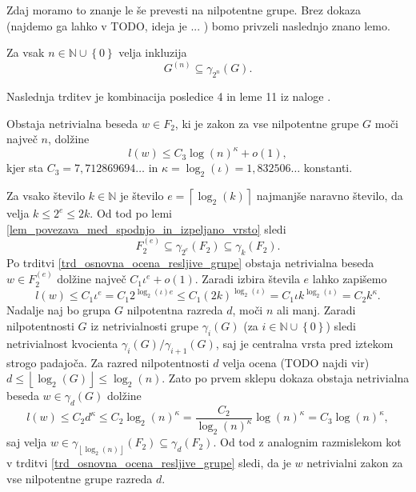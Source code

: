\documentclass[mat1, tisk]{fmfdelo}
\numberwithin{equation}{section}  %
\begin{document}
Zdaj moramo to znanje le še prevesti na nilpotentne grupe. Brez dokaza (najdemo ga lahko v TODO, ideja je ... ) bomo privzeli naslednjo znano lemo. 

\begin{lema}
\label{lem_povezava_med_spodnjo_in_izpeljano_vrsto}
Za vsak $n \in \mathbb{N} \cup \left\{ 0\right\} $ velja inkluzija
\begin{equation*}
G^{(n)} \subseteq \gamma_{2^{n}}(G).
\end{equation*}    
\end{lema}

Naslednja trditev je kombinacija posledice 4 in leme 11 iz naloge \cite{Schneider_2016}.

\begin{trditev}
\label{trd_koncna_ugotovitev_nilpotentne_v_nalogi}
 Obstaja netrivialna beseda $w \in F_2$, ki je zakon za vse nilpotentne grupe $G$ moči največ $n$, dolžine \begin{equation*}
 l(w) \le  C_3 \log(n)^{\kappa} + o(1),
 \end{equation*}  
 kjer sta $C_3 = 7{,}712869694 \ldots$ in $\kappa = \log_2(\iota) = 1{,}832506 \ldots$ konstanti.    
\end{trditev}

\begin{dokaz}
    Za vsako število $k \in  \mathbb{N}$ je
    število $e = \left\lceil \log_2(k) \right\rceil$ najmanjše naravno število, da velja $k \le 2^{e} \le 2k$.
    Od tod po lemi \ref{lem_povezava_med_spodnjo_in_izpeljano_vrsto} sledi \begin{equation*}
    F_2^{(e)} \subseteq \gamma_{2^{e}}(F_2) \subseteq \gamma_k(F_2).
    \end{equation*}  
     Po trditvi \ref{trd_osnovna_ocena_resljive_grupe} obstaja netrivialna beseda $w \in  F_2^{(e)}$ dolžine največ $C_1 \iota^{e} + o(1)$.
    Zaradi izbira števila $e$ lahko zapišemo \begin{equation*}
    l(w) \le  C_1 \iota^{e} = C_1 2^{\log_2(\iota) e} \le C_1 (2k)^{\log_2(\iota)} = C_1 \iota k^{\log_2(\iota)} = C_2  k^\kappa.
    \end{equation*}
    Nadalje naj bo grupa $G$ nilpotentna razreda $d$, moči $n$ ali manj. Zaradi nilpotentnosti $G$ iz netrivialnosti grupe $\gamma_i(G)$ (za $i \in \mathbb{N} \cup \left\{ 0 \right\}$) sledi netrivialnost kvocienta $\gamma_i(G) / \gamma_{i + 1}(G)$, saj je centralna vrsta pred iztekom strogo padajoča.
    Za razred nilpotentnosti $d$ velja ocena (TODO najdi vir) $d \le \left\lfloor \log_2(G)  \right\rfloor \le \log_2(n)$. Zato po prvem sklepu dokaza obstaja netrivialna beseda $w \in \gamma_d(G)$ dolžine \begin{equation*}
    l(w) \le C_2 d^{\kappa} \le C_2 \log_2(n)^{\kappa} = \frac{C_2}{\log_2(n)^{\kappa}} \log(n)^{\kappa} = C_3 \log(n)^{\kappa}, 
    \end{equation*}  
     saj velja $w \in \gamma_{\left\lfloor \log_2(n) \right\rfloor}(F_2) \subseteq \gamma_{d}(F_2)$. Od tod z analognim razmislekom kot v trditvi \ref{trd_osnovna_ocena_resljive_grupe} sledi, da je $w$ netrivialni zakon za vse nilpotentne grupe razreda $d$. 
\end{dokaz}
\end{document}
